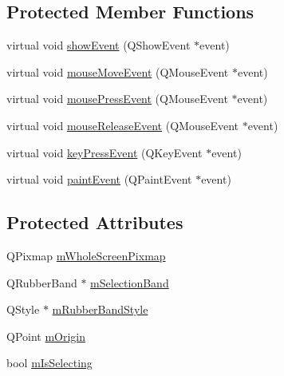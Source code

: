 \subsection*{Protected Member Functions}
\begin{DoxyCompactItemize}
\item 
virtual void \hyperlink{class_u_b_custom_capture_window_ab5494d4c45fc5dbdb39d2131f1e254aa}{show\-Event} (Q\-Show\-Event $\ast$event)
\item 
virtual void \hyperlink{class_u_b_custom_capture_window_ac26ad528214146b0f1e6e701d63017f9}{mouse\-Move\-Event} (Q\-Mouse\-Event $\ast$event)
\item 
virtual void \hyperlink{class_u_b_custom_capture_window_aa5eda111931dd5d60a8d2bb9e8e1eb30}{mouse\-Press\-Event} (Q\-Mouse\-Event $\ast$event)
\item 
virtual void \hyperlink{class_u_b_custom_capture_window_a39018a4cc02155e3f5b477cb21505126}{mouse\-Release\-Event} (Q\-Mouse\-Event $\ast$event)
\item 
virtual void \hyperlink{class_u_b_custom_capture_window_a2c7caedce728db39da2abd10ff9fb39d}{key\-Press\-Event} (Q\-Key\-Event $\ast$event)
\item 
virtual void \hyperlink{class_u_b_custom_capture_window_a0afabb009c50c5878da9b7cd443ac99e}{paint\-Event} (Q\-Paint\-Event $\ast$event)
\end{DoxyCompactItemize}
\subsection*{Protected Attributes}
\begin{DoxyCompactItemize}
\item 
Q\-Pixmap \hyperlink{class_u_b_custom_capture_window_ae47c19f393caad44319b55c30db43e40}{m\-Whole\-Screen\-Pixmap}
\item 
Q\-Rubber\-Band $\ast$ \hyperlink{class_u_b_custom_capture_window_a242415d0c985fcaec2f796a742f3fe0a}{m\-Selection\-Band}
\item 
Q\-Style $\ast$ \hyperlink{class_u_b_custom_capture_window_a2123422c01b98254eee4ad218c22c80e}{m\-Rubber\-Band\-Style}
\item 
Q\-Point \hyperlink{class_u_b_custom_capture_window_a55fd0b0fae074d24f3d2e2be9bcfad0c}{m\-Origin}
\item 
bool \hyperlink{class_u_b_custom_capture_window_a5c4361a10e32676ba7f2c2861b43cbd2}{m\-Is\-Selecting}
\end{DoxyCompactItemize}


